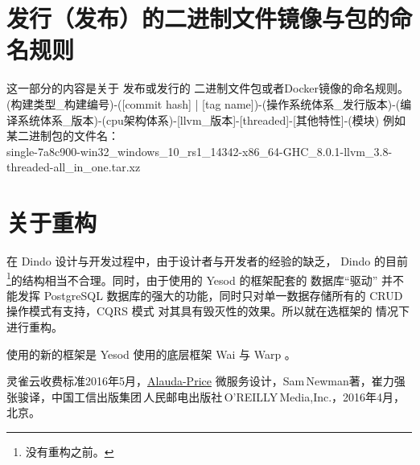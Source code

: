 \documentclass{dingo}
\begin{document}
\begin{appendix}
    \section{发行（发布）的二进制文件镜像与包的命名规则}
    这一部分的内容是关于 发布或发行的 二进制文件包或者Docker镜像的命名规则。
    (构建类型\_构建编号)-([commit hash] | [tag name])-(操作系统体系\_发行版本)-(编译系统体系\_版本)-(cpu架构体系)-[llvm\_版本]-[threaded]-[其他特性]-(模块)
    例如某二进制包的文件名：\\
    single-7a8c900-win32\_windows\_10\_rs1\_14342-x86\_64-GHC\_8.0.1-llvm\_3.8-threaded-all\_in\_one.tar.xz

    \section{关于重构}
    在 Dindo 设计与开发过程中，由于设计者与开发者的经验的缺乏， Dindo 的目前\footnote{没有重构之前。}的结构相当不合理。同时，由于使用的 Yesod 的框架配套的
    数据库“驱动” 并不能发挥 PostgreSQL 数据库的强大的功能，同时只对单一数据存储所有的 CRUD 操作模式有支持，CQRS 模式 对其具有毁灭性的效果。所以就在选框架的
    情况下进行重构。
    
    使用的新的框架是 Yesod 使用的底层框架 Wai 与 Warp 。
    

	  \begin{thebibliography}{}
		 	 灵雀云收费标准2016年5月，\href{http://www.alauda.cn/price/}{Alauda-Price}
		      微服务设计，Sam\,Newman著，崔力强\,张骏译，中国工信出版集团\,人民邮电出版社\,O'REILLY\,Media,Inc.，2016年4月，北京。
		\end{thebibliography}
  \end{appendix}
\end{document}
